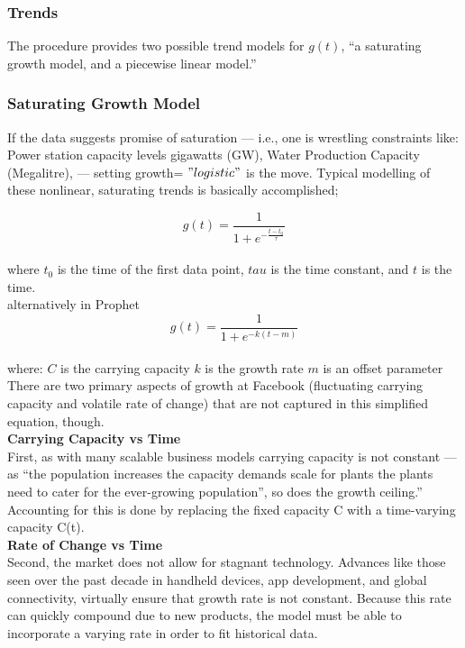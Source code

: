 \subsubsection{Trends}
The procedure provides two possible trend models for $g(t)$, “a saturating growth model, and a piecewise linear model.”

\subsubsection{Saturating Growth Model}
If the data suggests promise of saturation — i.e., one is wrestling constraints like: Power station capacity levels gigawatts (GW), Water Production Capacity (Megalitre), — 
setting growth= $"logistic"$ is the move.
Typical modelling of these nonlinear, saturating trends is basically accomplished;

\begin{equation}
    g(t) = \frac{1}{1+e^{-\frac{t-t_0}{\tau}}}
\end{equation} \\
    
    where $t_0$ is the time of the first data point, $tau$ is the time constant, and $t$ is the time. \\

alternatively in Prophet \\ 
\begin{equation}
    g(t) = \frac{1}{1+e^{-k(t-m)}}
\end{equation} \\
    
where:
$C$ is the carrying capacity
$k$ is the growth rate
$m$ is an offset parameter
There are two primary aspects of growth at Facebook (fluctuating carrying capacity and volatile rate of change) that are not captured in this simplified equation, though. \\

\textbf{Carrying Capacity vs Time} \\ 

First, as with many scalable business models carrying capacity is not constant — as “the population increases the capacity demands scale for plants the plants need to cater for the ever-growing population”, so does the growth ceiling.”
Accounting for this is done by replacing the fixed capacity C with a time-varying capacity C(t). \\

\textbf{Rate of Change vs Time} \\
Second, the market does not allow for stagnant technology. Advances like those seen over the past decade in handheld devices, app development, and global connectivity, virtually ensure that growth rate is not constant.
Because this rate can quickly compound due to new products, the model must be able to incorporate a varying rate in order to fit historical data. \\

